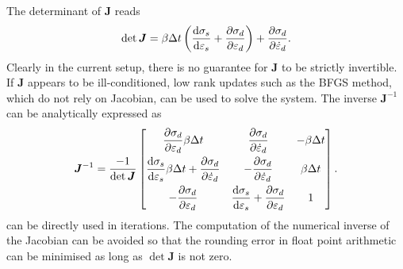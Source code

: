 The determinant of $\mathbold{J}$ reads
\begin{gather}
\det{\bm{J}}=\beta\Delta{}t\left(\dfrac{\mathrm{d}\sigma_s}{\mathrm{d}\varepsilon_s}+\dfrac{\partial\sigma_d}{\partial\varepsilon_d}\right)+\dfrac{\partial\sigma_d}{\partial\dot\varepsilon_d}.
\end{gather}
Clearly in the current setup, there is no guarantee for $\mathbold{J}$ to be strictly invertible. If $\mathbold{J}$ appears to be ill-conditioned, low rank updates such as the BFGS method, which do not rely on Jacobian, can be used to solve the system. The inverse $\mathbold{J}^{-1}$ can be analytically expressed as
\begin{gather}\label{eq:inv_j}
\bm{J}^{-1}=\dfrac{-1}{\det{\bm{J}}}\begin{bmatrix}
	\dfrac{\partial\sigma_d}{\partial\varepsilon_d}\beta\Delta{}t                                               & \dfrac{\partial\sigma_d}{\partial\dot\varepsilon_d}                                       & -\beta\Delta{}t \\[3mm]
	\dfrac{\mathrm{d}\sigma_s}{\mathrm{d}\varepsilon_s}\beta\Delta{}t+\dfrac{\partial\sigma_d}{\partial\dot\varepsilon_d} & -\dfrac{\partial\sigma_d}{\partial\dot\varepsilon_d}                                      & \beta\Delta{}t  \\[3mm]
	-\dfrac{\partial\sigma_d}{\partial\varepsilon_d}                                                            & \dfrac{\mathrm{d}\sigma_s}{\mathrm{d}\varepsilon_s}+\dfrac{\partial\sigma_d}{\partial\varepsilon_d} & 1
\end{bmatrix}.
\end{gather}
 can be directly used in iterations. The computation of the numerical inverse of the Jacobian can be avoided so that the rounding error in float point arithmetic can be minimised as long as $\det{\mathbold{J}}$ is not zero.

